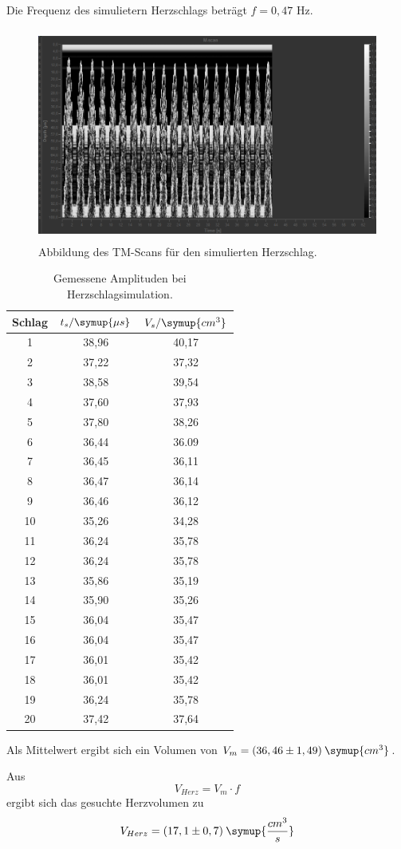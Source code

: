 Die Frequenz des simulietern Herzschlags beträgt $f = 0,47$ Hz.

\begin{figure}[H]
  \centering
  \includegraphics[height=7cm]{TM-Scan.PNG}
  \caption{Abbildung des TM-Scans für den simulierten Herzschlag.}
  \label{fig:TM}
\end{figure}

\begin{table}[H]
  \centering
  \caption{Gemessene Amplituden bei Herzschlagsimulation.}
  \label{tab:1}
  \begin{tabular}{c c c }
    \toprule
  Schlag & $t_s/\symup{\mu s}$ & $V_s/\symup{cm^3}$ \\
    \midrule
    1  &  38,96 & 40,17     \\
    2  &  37,22 & 37,32     \\
    3  &  38,58 & 39,54     \\
    4  &  37,60 & 37,93     \\
    5  &  37,80 & 38,26     \\
    6  &  36,44 & 36.09     \\
    7  &  36,45 & 36,11     \\
    8  &  36,47 & 36,14     \\
    9  &  36,46 & 36,12     \\
    10 &  35,26 & 34,28      \\
    11 &  36,24 & 35,78     \\
    12  &  36,24 & 35,78     \\
    13  &  35,86 & 35,19     \\
    14  &  35,90 & 35,26     \\
    15  &  36,04 & 35,47     \\
    16  &  36,04 & 35,47     \\
    17  &  36,01 & 35,42     \\
    18  &  36,01 & 35,42     \\
    19  &  36,24 & 35,78     \\
    20  &  37,42 & 37,64     \\
    \bottomrule
  \end{tabular}
\end{table}

Als Mittelwert ergibt sich ein Volumen von $V_{m} = (36,46 \pm 1,49) \: \symup{cm^3}$.

Aus
\begin{equation*}
  V_{Herz} = V_m \cdot f
\end{equation*}
ergibt sich das gesuchte Herzvolumen zu
\begin{equation*}
  V_{Herz} = (17,1 \pm 0,7) \: \symup{\frac{cm^3}{s}}
\end{equation*}
